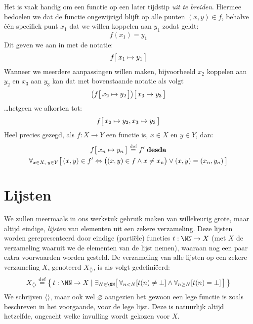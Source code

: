 Het is vaak handig om een functie op een later tijdstip \emph{uit te breiden}. Hiermee bedoelen we dat de functie ongewijzigd blijft op alle punten $(x, y) \in f$, behalve één specifiek punt $x_1$ dat we willen koppelen aan $y_1$ zodat geldt:
%
\begin{equation*}
  f(x_1) = y_1
\end{equation*}
%
Dit geven we aan in met de notatie:
%
\begin{equation*}
  f\big[\, x_1 \mapsto y_1 \,\big]
\end{equation*}
%
Wanneer we meerdere aanpassingen willen maken, bijvoorbeeld $x_2$ koppelen aan $y_2$ en $x_3$ aan $y_3$ kan dat met bovenstaande notatie als volgt
%
\begin{equation*}
  \big(f\big[\, x_2 \mapsto y_2 \,\big]\big)\big[\, x_3 \mapsto y_3 \,\big]
\end{equation*}
%
\dots hetgeen we afkorten tot:
%
\begin{equation*}
  f\big[\, x_2 \mapsto y_2, x_3 \mapsto y_3 \,\big]
\end{equation*}
%
Heel precies gezegd, als $f : X \to Y$ een functie is, $x \in X$ en $y \in Y$, dan:
%
\begin{multline*}
  f\surr{ x_n \mapsto y_n } \DEF f' \;\mathbf{desda} \\
  \forall_{x \in X,\; y \in Y} \surr{ (x, y) \in f' \Leftrightarrow \big( (x, y) \in f \land x \neq x_n \big) \lor (x, y) = (x_n, y_n) }
\end{multline*}

\section{Lijsten}

We zullen meermaals in ons werkstuk gebruik maken van willekeurig grote, maar altijd eindige, \emph{lijsten} van elementen uit een zekere verzameling. Deze lijsten worden gerepresenteerd door eindige (partiële) functies $t : \NN \to X$ (met $X$ de verzameling waaruit we de elementen van de lijst nemen), waaraan nog een paar extra voorwaarden worden gesteld. De verzameling van alle lijsten op een zekere verzameling $X$, genoteerd $X_{\langle\rangle}$, is als volgt gedefiniëerd:
\begin{equation*}
X_{\langle\rangle} \DEF \big\{\, t : \NN \to X \mid \exists_{N \in \NN} \surr{ \forall_{n < N}[t(n) \neq \bot] \land \forall_{n\ge N}[t(n) = \bot] } \,\big\}
\end{equation*}
We schrijven $\langle\rangle$, maar ook wel $\varnothing$ aangezien het gewoon een lege functie is zoals beschreven in het voorgaande, voor de lege lijst. Deze is natuurlijk altijd hetzelfde, ongeacht welke invulling wordt gekozen voor $X$.

